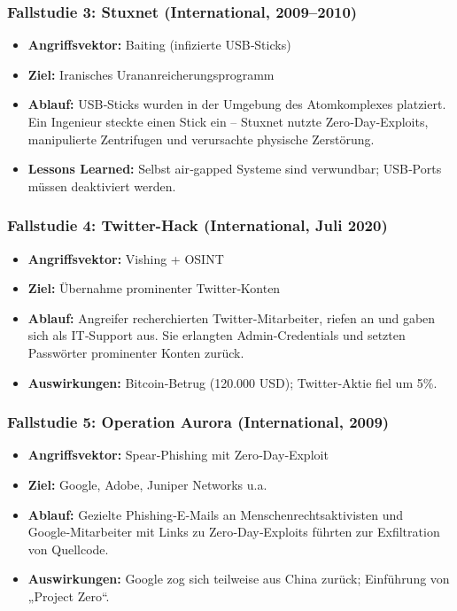 \documentclass[10pt,a4paper]{article}
\begin{document}
	\subsubsection{Fallstudie 3: Stuxnet (International, 2009–2010)}
	\begin{itemize}
		\item \textbf{Angriffsvektor:} Baiting (infizierte USB‑Sticks)
		\item \textbf{Ziel:} Iranisches Urananreicherungsprogramm
		\item \textbf{Ablauf:} USB‑Sticks wurden in der Umgebung des Atomkomplexes platziert. Ein Ingenieur steckte einen Stick ein – Stuxnet nutzte Zero‑Day‑Exploits, manipulierte Zentrifugen und verursachte physische Zerstörung.
		\item \textbf{Lessons Learned:} Selbst air‑gapped Systeme sind verwundbar; USB‑Ports müssen deaktiviert werden.
	\end{itemize}
	
	\subsubsection{Fallstudie 4: Twitter-Hack (International, Juli 2020)}
	\begin{itemize}
		\item \textbf{Angriffsvektor:} Vishing + OSINT
		\item \textbf{Ziel:} Übernahme prominenter Twitter‑Konten
		\item \textbf{Ablauf:} Angreifer recherchierten Twitter‑Mitarbeiter, riefen an und gaben sich als IT‑Support aus. Sie erlangten Admin‑Credentials und setzten Passwörter prominenter Konten zurück.
		\item \textbf{Auswirkungen:} Bitcoin‑Betrug (120.000 USD); Twitter‑Aktie fiel um 5\%.
	\end{itemize}
	
	\subsubsection{Fallstudie 5: Operation Aurora (International, 2009)}
	\begin{itemize}
		\item \textbf{Angriffsvektor:} Spear‑Phishing mit Zero‑Day‑Exploit
		\item \textbf{Ziel:} Google, Adobe, Juniper Networks u.a.
		\item \textbf{Ablauf:} Gezielte Phishing‑E‑Mails an Menschenrechtsaktivisten und Google‑Mitarbeiter mit Links zu Zero‑Day‑Exploits führten zur Exfiltration von Quellcode.
		\item \textbf{Auswirkungen:} Google zog sich teilweise aus China zurück; Einführung von „Project Zero“.
	\end{itemize}
	
\end{document}

